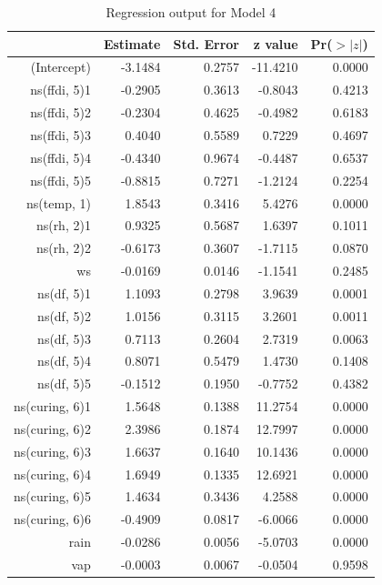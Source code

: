 \documentclass[11pt,a4paper]{article}
\begin{document}
\begin{table}
  \centering
  \begin{tabular}{rrrrr}
    \toprule
                   & Estimate & Std. Error & z value  & Pr($>|z|$) \\
    \midrule
    (Intercept)    & -3.1484  & 0.2757     & -11.4210 & 0.0000 \\
    ns(ffdi, 5)1   & -0.2905  & 0.3613     & -0.8043  & 0.4213 \\
    ns(ffdi, 5)2   & -0.2304  & 0.4625     & -0.4982  & 0.6183 \\
    ns(ffdi, 5)3   & 0.4040   & 0.5589     & 0.7229   & 0.4697 \\
    ns(ffdi, 5)4   & -0.4340  & 0.9674     & -0.4487  & 0.6537 \\
    ns(ffdi, 5)5   & -0.8815  & 0.7271     & -1.2124  & 0.2254 \\
    ns(temp, 1)    & 1.8543   & 0.3416     & 5.4276   & 0.0000 \\
    ns(rh, 2)1     & 0.9325   & 0.5687     & 1.6397   & 0.1011 \\
    ns(rh, 2)2     & -0.6173  & 0.3607     & -1.7115  & 0.0870 \\
    ws             & -0.0169  & 0.0146     & -1.1541  & 0.2485 \\
    ns(df, 5)1     & 1.1093   & 0.2798     & 3.9639   & 0.0001 \\
    ns(df, 5)2     & 1.0156   & 0.3115     & 3.2601   & 0.0011 \\
    ns(df, 5)3     & 0.7113   & 0.2604     & 2.7319   & 0.0063 \\
    ns(df, 5)4     & 0.8071   & 0.5479     & 1.4730   & 0.1408 \\
    ns(df, 5)5     & -0.1512  & 0.1950     & -0.7752  & 0.4382 \\
    ns(curing, 6)1 & 1.5648   & 0.1388     & 11.2754  & 0.0000 \\
    ns(curing, 6)2 & 2.3986   & 0.1874     & 12.7997  & 0.0000 \\
    ns(curing, 6)3 & 1.6637   & 0.1640     & 10.1436  & 0.0000 \\
    ns(curing, 6)4 & 1.6949   & 0.1335     & 12.6921  & 0.0000 \\
    ns(curing, 6)5 & 1.4634   & 0.3436     & 4.2588   & 0.0000 \\
    ns(curing, 6)6 & -0.4909  & 0.0817     & -6.0066  & 0.0000 \\
    rain           & -0.0286  & 0.0056     & -5.0703  & 0.0000 \\
    vap            & -0.0003  & 0.0067     & -0.0504  & 0.9598 \\
    \bottomrule
  \end{tabular}
  \caption{Regression output for Model 4}
  \label{table:logf}
\end{table}
\end{document}
